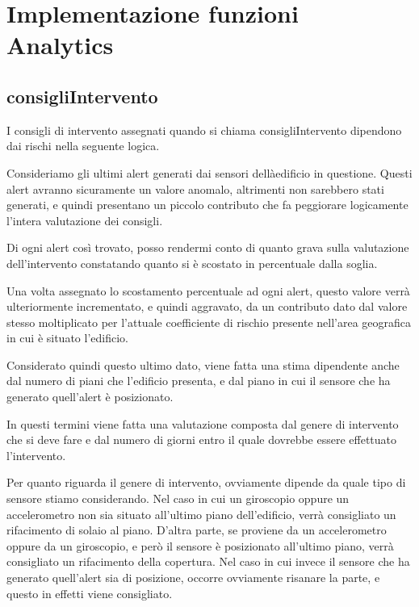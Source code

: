 \documentclass[12pt,a4paper]{report}
\begin{document}
            \chapter{Implementazione funzioni Analytics}
                \section{consigliIntervento}
                I consigli di intervento assegnati quando si chiama consigliIntervento dipendono dai rischi nella seguente logica.

                Consideriamo gli ultimi alert generati dai sensori dellàedificio in questione. Questi alert avranno sicuramente un valore anomalo, altrimenti non sarebbero stati generati, e quindi presentano un piccolo contributo che fa peggiorare logicamente l'intera valutazione dei consigli.

                Di ogni alert così trovato, posso rendermi conto di quanto grava sulla valutazione dell'intervento constatando quanto si è scostato in percentuale dalla soglia.

                Una volta assegnato lo scostamento percentuale ad ogni alert, questo valore verrà ulteriormente incrementato, e quindi aggravato, da un contributo dato dal valore stesso moltiplicato per l'attuale coefficiente di rischio presente nell'area geografica in cui è situato l'edificio.

                Considerato quindi questo ultimo dato, viene fatta una stima dipendente anche dal numero di piani che l'edificio presenta, e dal piano in cui il sensore che ha generato quell'alert è posizionato.

                In questi termini viene fatta una valutazione composta dal genere di intervento che si deve fare e dal numero di giorni entro il quale dovrebbe essere effettuato l'intervento.

                Per quanto riguarda il genere di intervento, ovviamente dipende da quale tipo di sensore stiamo considerando. Nel caso in cui un giroscopio oppure un accelerometro non sia situato all'ultimo piano dell'edificio, verrà consigliato un rifacimento di solaio al piano. D'altra parte, se proviene da un accelerometro oppure da un giroscopio, e però il sensore è posizionato all'ultimo piano, verrà consigliato un rifacimento della copertura. Nel caso in cui invece il sensore che ha generato quell'alert sia di posizione, occorre ovviamente risanare la parte, e questo in effetti viene consigliato.
\end{document}
